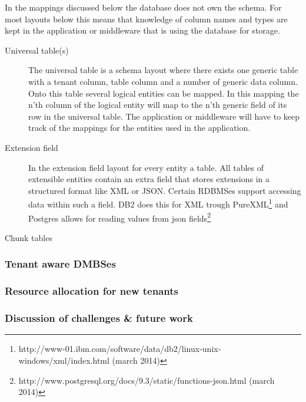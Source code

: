 In the mappings discussed below the database does not own the schema. 
For most layouts below this means that knowledge of column names and types are kept in the application or middleware that is using the database for storage. 
\begin{description}
	\item[Universal table(s)]
		The universal table is a schema layout where there exists one generic table with a tenant column, table column and a number of generic data column.
		Onto this table several logical entities can be mapped.
		In this mapping the n'th column of the logical entity will map to the n'th generic field of its row in the universal table.
		The application or middleware will have to keep track of the mappings for the entities used in the application.\cite{aulbach2008multi}

	\item[Extension field]
		In the extension field layout for every entity a table.
		All tables of extensible entities contain an extra field that stores extensions in a structured format like XML or JSON.
		Certain RDBMSes support accessing data within such a field. 
		DB2 does this for XML trough PureXML\footnote{http://www-01.ibm.com/software/data/db2/linux-unix-windows/xml/index.html (march 2014)} and Postgres allows for reading values from json fields\footnote{http://www.postgresql.org/docs/9.3/static/functions-json.html (march 2014)}
	
	\item[Chunk tables] 
\end{description}

\subsubsection{Tenant aware DMBSes}

\subsubsection{Resource allocation for new tenants}

\subsubsection{Discussion of challenges \& future work}
